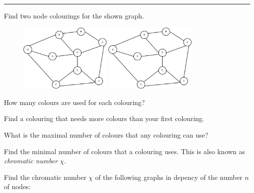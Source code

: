 

\usepackage{pstricks,pst-node,pst-tree}
\usepackage{graphicx}




  \sheet[%
  number=2,
      topic={Graph },
    ]

\vspace{-1cm}
\noindent\rule{12cm}{0.4pt}

  \exercise[%
  topic = Node colouring 
    ]

%



 \subexercise[%
  topic=Colouring a Graph,
    ]

Find two node colourings for the shown graph.

\begin{figure}[h]
\includegraphics[width=0.4\textwidth]{graph_colouring.eps}
\includegraphics[width=0.4\textwidth]{graph_colouring.eps}
\end{figure}

How many colours are used for each colouring?

Find a colouring that needs more colours than your first colouring.

What is the maximal number of colours that any colouring can use?

Find the minimal number of colours that a colouring uses. This is also known as \emph{chromatic number} $\chi$.

\subexercise[%
  topic=Chromatic Number of Graph Models,
    ]
		\label{subseq:graphen}
		
Find the chromatic number $\chi$ of the following graphs in depency of the number $n$ of nodes:

